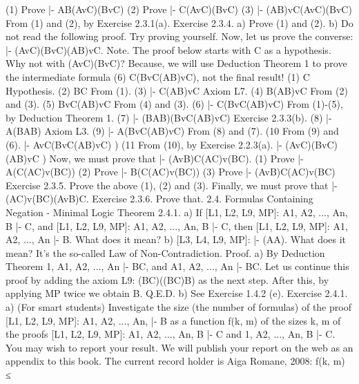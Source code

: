 (1) Prove |- A\AND B\IMPLIES (AvC)\AND (BvC)
(2) Prove |- C\IMPLIES (AvC)\AND (BvC)
(3) |- (A\AND B)vC\IMPLIES (AvC)\AND (BvC)
From (1) and (2), by Exercise 2.3.1(a).
Exercise 2.3.4. a) Prove (1) and (2).
b) Do not read the following proof. Try proving yourself.
Now, let us prove the converse: |- (AvC)\AND (BvC)\IMPLIES (A\AND B)vC.
Note. The proof below starts with C as a hypothesis. Why not with (AvC)\AND (BvC)? Because, we will use
Deduction Theorem 1 to prove the intermediate formula (6) C\IMPLIES (BvC\IMPLIES (A\AND B)vC), not the final result!
(1) C Hypothesis.
(2) B\IMPLIES C From (1).
(3) |- C\IMPLIES (A\AND B)vC Axiom L7.
(4) B\IMPLIES (A\AND B)vC From (2) and (3).
(5) BvC\IMPLIES (A\AND B)vC From (4) and (3).
(6) |- C\IMPLIES (BvC\IMPLIES (A\AND B)vC) From (1)-(5), by Deduction Theorem 1.
(7) |- (B\IMPLIES A\AND B)\IMPLIES (BvC\IMPLIES (A\AND B)vC) Exercise 2.3.3(b).
(8) |- A\IMPLIES (B\IMPLIES A\AND B) Axiom L3.
(9) |- A\IMPLIES (BvC\IMPLIES (A\AND B)vC) From (8) and (7).
(10 From (9) and (6).
|- AvC\IMPLIES (BvC\IMPLIES (A\AND B)vC) 
    ) 
(11 From (10), by Exercise 2.2.3(a).
|- (AvC)\AND (BvC)\IMPLIES (A\AND B)vC 
  ) 
Now, we must prove that |- (AvB)\AND C\IMPLIES (A\AND C)v(B\AND C).
(1) Prove |- A\IMPLIES (C\IMPLIES (A\AND C)v(B\AND C))
(2) Prove |- B\IMPLIES (C\IMPLIES (A\AND C)v(B\AND C))
(3) Prove |- (AvB)\AND C\IMPLIES (A\AND C)v(B\AND C)
Exercise 2.3.5. Prove the above (1), (2) and (3).
Finally, we must prove that |- (A\AND C)v(B\AND C)\IMPLIES (AvB)\AND C.
Exercise 2.3.6. Prove that.
2.4. Formulas Containing Negation - Minimal Logic
Theorem 2.4.1. a) If [L1, L2, L9, MP]: A1, A2, ..., An, B |- C, and [L1, L2, L9, MP]: A1, A2, ..., An, B |-
\neg C, then [L1, L2, L9, MP]: A1, A2, ..., An |- \neg B. What does it mean?
b) [L3, L4, L9, MP]: |- \neg (A\AND \neg A). What does it mean? It's the so-called Law of Non-Contradiction.
Proof. a) By Deduction Theorem 1, A1, A2, ..., An |- B\IMPLIES C, and A1, A2, ..., An |- B\IMPLIES \neg C. Let us continue
this proof by adding the axiom L9: (B\IMPLIES C)\IMPLIES ((B\IMPLIES \neg C)\IMPLIES \neg B) as the next step. After this, by applying MP
twice we obtain \neg B. Q.E.D.
b) See Exercise 1.4.2 (e).
Exercise 2.4.1. a) (For smart students) Investigate the size (the number of formulas) of the proof [L1, L2,
L9, MP]: A1, A2, ..., An, |- \neg B as a function f(k, m) of the sizes k, m of the proofs [L1, L2, L9, MP]: A1,
A2, ..., An, B |- C and 1, A2, ..., An, B |- \neg C. You may wish to report your result. We will publish your
report on the web as an appendix to this book. The current record holder is Aiga Romane, 2008: f(k, m) ≤
